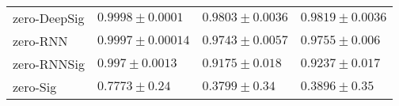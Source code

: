 \begin{tabular}{llll}
zero-DeepSig   &                $  \mathbf{ 0.9998 \pm 0.0001 } $ &                           $ 0.9803 \pm 0.0036 $ &                           $ 0.9819 \pm 0.0036 $ \\
zero-RNN       &                           $ 0.9997 \pm 0.00014 $ &                           $ 0.9743 \pm 0.0057 $ &                            $ 0.9755 \pm 0.006 $ \\
zero-RNNSig    &                             $ 0.997 \pm 0.0013 $ &                            $ 0.9175 \pm 0.018 $ &                            $ 0.9237 \pm 0.017 $ \\
zero-Sig       &                              $ 0.7773 \pm 0.24 $ &                             $ 0.3799 \pm 0.34 $ &                             $ 0.3896 \pm 0.35 $ \\
\bottomrule
\end{tabular}
